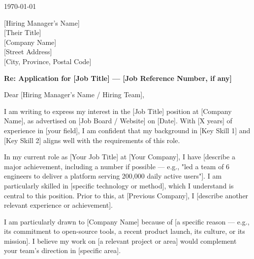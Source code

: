 \bigskip


\today

\bigskip


[Hiring Manager's Name] \\ {}
[Their Title] \\ {}
[Company Name] \\ {}
[Street Address] \\ {}
[City, Province, Postal Code]

\bigskip


\textbf{Re: Application for [Job Title] --- [Job Reference Number, if any]}

\medskip   %


Dear [Hiring Manager's Name / Hiring Team],

\medskip


I am writing to express my interest in the [Job Title] position at [Company Name],
as advertised on [Job Board / Website] on [Date]. With [X years] of experience in
[your field], I am confident that my background in [Key Skill 1] and [Key Skill 2]
aligns well with the requirements of this role.


In my current role as [Your Job Title] at [Your Company], I have [describe a
major achievement, including a number if possible --- e.g., "led a team of 6
engineers to deliver a platform serving 200,000 daily active users"]. I am
particularly skilled in [specific technology or method], which I understand is
central to this position. Prior to this, at [Previous Company], I [describe
another relevant experience or achievement].


I am particularly drawn to [Company Name] because of [a specific reason ---
e.g., its commitment to open-source tools, a recent product launch, its culture,
or its mission]. I believe my work on [a relevant project or area] would
complement your team's direction in [specific area].


